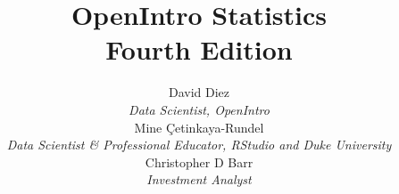 
\title{\huge OpenIntro Statistics\vspace{1.5mm} \\
    \Large Fourth Edition}
\author{David Diez \\
\small\emph{Data Scientist, OpenIntro} \\[6mm]
Mine \c{C}etinkaya-Rundel \\
\small\emph{Data Scientist \& Professional Educator, RStudio and Duke University} \\[6mm]
Christopher D Barr \\
\small\emph{Investment Analyst} \\
}
